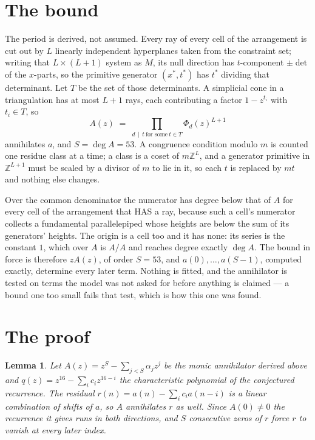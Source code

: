 \documentclass[11pt,a4paper]{article}
\theoremstyle{plain}
\newtheorem{lemma}[theorem]{Lemma}
\theoremstyle{definition}
\begin{document}
\section{The bound}

The period is derived, not assumed. Every ray of every cell of the arrangement is cut out by
$L$ linearly independent hyperplanes taken from the constraint set; writing that $L\times(L+1)$
system as $M$, its null direction has $t$-component $\pm\det$ of the $x$-parts, so the
primitive generator $(x^*,t^*)$ has $t^*$ dividing that determinant. Let $T$ be the set of
those determinants. A simplicial cone in a triangulation has at most $L+1$ rays, each
contributing a factor $1-z^{t_i}$ with $t_i\in T$, so
\[
A(z)\;=\;\prod_{d\,\mid\,t\ \text{for some}\ t\in T}\Phi_d(z)^{L+1}
\]
annihilates $a$, and $S=\deg A=53$. A congruence condition modulo $m$ is counted one residue
class at a time; a class is a coset of $m\mathbb{Z}^L$, and a generator primitive in
$\mathbb{Z}^{L+1}$ must be scaled by a divisor of $m$ to lie in it, so each $t$ is replaced
by $mt$ and nothing else changes.

Over the common denominator the numerator has degree below that of $A$ for every cell of the
arrangement that HAS a ray, because such a cell's numerator collects a fundamental
parallelepiped whose heights are below the sum of its generators' heights. The origin is a cell
too and it has none: its series is the constant $1$, which over $A$ is $A/A$ and reaches degree
exactly $\deg A$. The bound in force is therefore $zA(z)$, of order $S=53$, and
$a(0),\dots,a(S-1)$, computed exactly, determine every later term. Nothing is fitted, and the
annihilator is tested on terms the model was not asked for before anything is claimed --- a
bound one too small fails that test, which is how this one was found.

\section{The proof}

\begin{lemma}\label{lem:crit}
Let $A(z)=z^S-\sum_{j<S}\alpha_jz^{j}$ be the monic annihilator derived above and
$q(z)=z^{16}-\sum_ic_iz^{16-i}$ the characteristic polynomial of the conjectured
recurrence. The residual $r(n)=a(n)-\sum_ic_ia(n-i)$ is a linear combination of shifts of $a$,
so $A$ annihilates $r$ as well. Since $A(0)\ne0$ the recurrence it gives runs in both
directions, and $S$ consecutive zeros of $r$ force $r$ to vanish at every later index.
\end{lemma}
\end{document}
